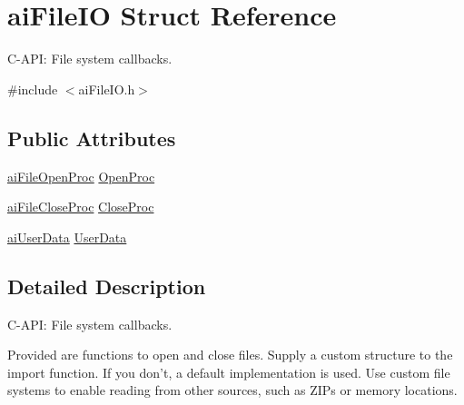 \hypertarget{structai_file_i_o}{\section{ai\-File\-I\-O Struct Reference}
\label{structai_file_i_o}
}


C-\/\-A\-P\-I\-: File system callbacks.  




{\ttfamily \#include $<$ai\-File\-I\-O.\-h$>$}

\subsection*{Public Attributes}
\begin{DoxyCompactItemize}
\item 
\hyperlink{ai_file_i_o_8h_aa2746201910ae213e98ef82d4f313d66}{ai\-File\-Open\-Proc} \hyperlink{structai_file_i_o_a819d9c7823039294125068d06949a6df}{Open\-Proc}
\item 
\hyperlink{ai_file_i_o_8h_a32e3d4bf95dfb921a263a4aa77105c0f}{ai\-File\-Close\-Proc} \hyperlink{structai_file_i_o_a7ec702672712b5a02dc49cb17f980a14}{Close\-Proc}
\item 
\hyperlink{ai_file_i_o_8h_a176132d0cd51c96302089ff3f8a8ee1c}{ai\-User\-Data} \hyperlink{structai_file_i_o_a9c62b7f3d70fbb2f41e33ad0b9933139}{User\-Data}
\end{DoxyCompactItemize}


\subsection{Detailed Description}
C-\/\-A\-P\-I\-: File system callbacks. 

Provided are functions to open and close files. Supply a custom structure to the import function. If you don't, a default implementation is used. Use custom file systems to enable reading from other sources, such as Z\-I\-Ps or memory locations. 

